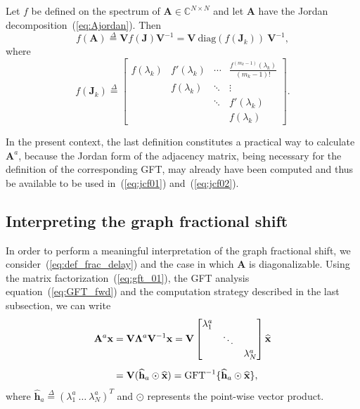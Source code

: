 \begin{definition}\label{def:jc01}
Let $f$ be defined on the spectrum of $\mathbf{A}\in\mathbb{C}^{N\times N}$ and let $\mathbf{A}$ have the Jordan decomposition~(\ref{eq:Ajordan}). Then
\begin{equation}\label{eq:jcf01}
    f(\mathbf{A})\overset{\Delta}{=}\mathbf{V}f(\mathbf{J})\mathbf{V}^{-1}=\mathbf{V} \ \mathrm{diag}(f(\mathbf{J}_k)) \ \mathbf{V}^{-1},
\end{equation}
where
\begin{equation}\label{eq:jcf02}
    f(\mathbf{J}_k)\overset{\Delta}{=}\left[\begin{array}{cccc}
    f(\lambda_k)&f'(\lambda_k)&\cdots &\frac{f^{(m_k-1)}(\lambda_k)}{(m_k-1)!}\\
    &f(\lambda_k)&\ddots &\vdots\\
    &&\ddots & f'(\lambda_k)\\
    &&&f(\lambda_k)\end{array}\right].
\end{equation}
\end{definition}
In the present context, the last definition constitutes a practical way to calculate $\mathbf{A}^a$, because the Jordan form of the adjacency matrix, being necessary for the definition of the corresponding GFT, may already have been computed and thus be available to be used in~(\ref{eq:jcf01}) and~(\ref{eq:jcf02}).


\subsection{Interpreting the graph fractional shift}\label{subsec:interpret}
In order to perform a meaningful interpretation of the graph fractional shift, we consider~(\ref{eq:def_frac_delay}) and the case in which $\mathbf{A}$ is diagonalizable. Using the matrix factorization~(\ref{eq:gft_01}), the GFT analysis equation~(\ref{eq:GFT_fwd}) and the computation strategy described in the last subsection, we can write
\begin{align}\label{eq:frac_delay_01}
\mathbf{A}^a \mathbf{x} &= \mathbf{V} \mathbf{\Lambda}^a \mathbf{V}^{-1} \mathbf{x} = \mathbf{V}
\begin{bmatrix}
\lambda_1^a &  & \\ 
& \ddots & \\ 
&  & \lambda_N^a
\end{bmatrix}
\widehat{\mathbf{x}} \notag \\[0.5em]
&= \mathbf{V} (\widehat{\mathbf{h}}_a \odot \widehat{\mathbf{x}}) = \text{GFT}^{-1} \{\widehat{\mathbf{h}}_a \odot \widehat{\mathbf{x}}\},
\end{align}
where $\widehat{\mathbf{h}}_a \overset{\Delta}{=} (\lambda_1^a \ \ldots \ \lambda_N^a)^T$ and $\odot$ represents the point-wise vector product.

